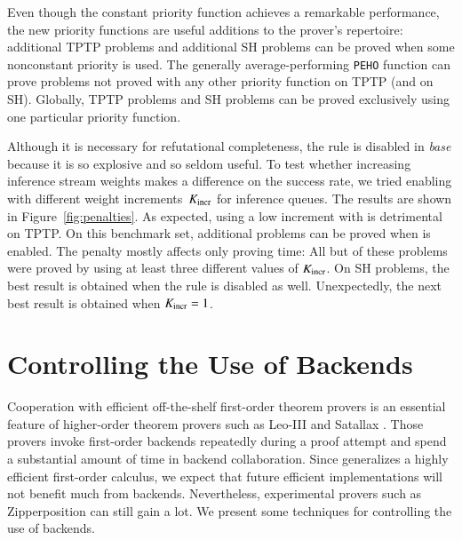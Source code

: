 Even though the constant priority function achieves a remarkable performance, the new priority functions are
useful additions to the prover's repertoire:  additional
TPTP problems and  additional SH problems can be proved when some
nonconstant priority is used. The generally average-performing \verb|PEHO|
function can prove  problems not proved with any other priority function on TPTP
(and  on SH). Globally,  TPTP problems and  SH problems
can be proved exclusively using one particular priority function.


Although it is necessary for refutational completeness, the 
rule is disabled in \emph{base} because it is so explosive and so seldom useful.
To test whether increasing inference stream weights makes a difference on the
success rate, we tried enabling  with different weight
increments~$K_\mathrm{incr}$ for  inference queues. The
results are shown in Figure~\ref{fig:penalties}. As expected, using a low
increment with  is detrimental on TPTP. On this
benchmark set,  additional problems can be proved when
 is enabled. The penalty mostly affects only proving time: All
but  of these problems were proved by using at least three different
values of $K_\mathrm{incr}$. On SH problems, the best result is obtained
when the rule is disabled as well. Unexpectedly, the next best result is obtained when
$K_\mathrm{incr}=1$.

\section{Controlling the Use of Backends}
\label{sec:ho-tech:backends}

\newcommand{\ParamNumClauses}{\ensuremath{K_\mathrm{size}}}
\newcommand{\ParamTime}{\ensuremath{K_\mathrm{time}}}

Cooperation with efficient off-the-shelf first-order theorem provers is an
essential feature of higher-order theorem provers such as Leo-III
\cite[Sect.~4.4]{as-18-phd} and Satallax \cite{cb-2013-satallax}.
Those provers invoke first-order backends repeatedly
during a proof attempt and spend a substantial amount of time in backend
collaboration. Since \lsup{} generalizes a highly efficient
first-order calculus, we expect that future efficient \lsup{}
implementations will not benefit much from backends.
Nevertheless, experimental provers such
as Zipperposition can still gain a lot. We present some
techniques for controlling the use of backends.

